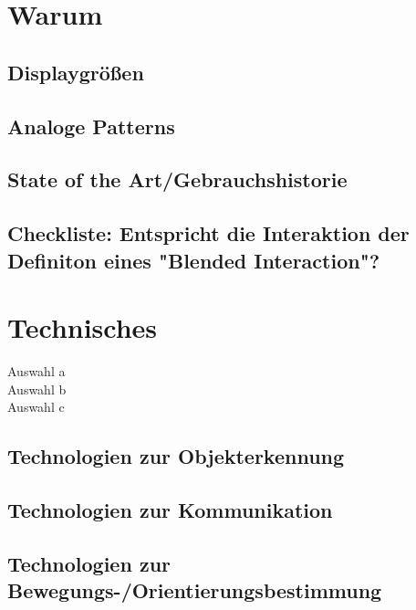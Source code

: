 
\section*{Warum}


\subsection*{Displaygrößen}


\subsection*{Analoge Patterns}


\subsection*{State of the Art/Gebrauchshistorie}


\subsection*{Checkliste: Entspricht die Interaktion der Definiton eines "Blended Interaction"?}


\section*{Technisches}


\checkbox{\auswahla} Auswahl a \\
\checkbox{\auswahlb} Auswahl b \\
\checkbox{\auswahlc} Auswahl c \\


\subsection*{Technologien zur Objekterkennung}


\subsection*{Technologien zur Kommunikation}


\subsection*{Technologien zur Bewegungs-/Orientierungsbestimmung}


